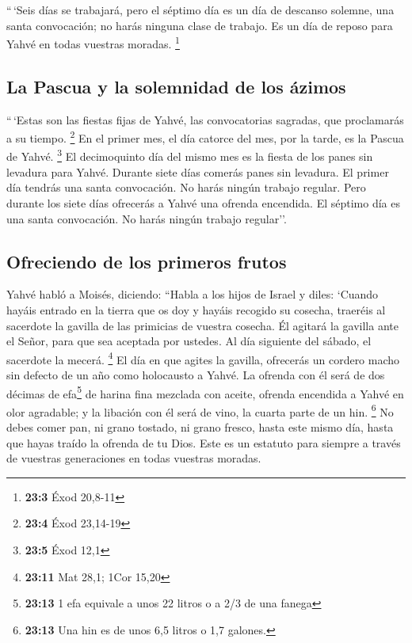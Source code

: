  ``\,`Seis días se trabajará, pero el séptimo día es un
día de descanso solemne, una santa convocación; no harás ninguna clase
de trabajo. Es un día de reposo para Yahvé en todas vuestras moradas.
\footnote{\textbf{23:3} Éxod 20,8-11}

\hypertarget{la-pascua-y-la-solemnidad-de-los-uxe1zimos}{%
\subsection{La Pascua y la solemnidad de los
ázimos}\label{la-pascua-y-la-solemnidad-de-los-uxe1zimos}}

 ``\,`Estas son las fiestas fijas de Yahvé, las
convocatorias sagradas, que proclamarás a su tiempo. \footnote{\textbf{23:4}
  Éxod 23,14-19}  En el primer mes, el día catorce del
mes, por la tarde, es la Pascua de Yahvé. \footnote{\textbf{23:5} Éxod
  12,1}  El decimoquinto día del mismo mes es la fiesta de
los panes sin levadura para Yahvé. Durante siete días comerás panes sin
levadura.  El primer día tendrás una santa convocación. No
harás ningún trabajo regular.  Pero durante los siete días
ofrecerás a Yahvé una ofrenda encendida. El séptimo día es una santa
convocación. No harás ningún trabajo regular''.

\hypertarget{ofreciendo-de-los-primeros-frutos}{%
\subsection{Ofreciendo de los primeros
frutos}\label{ofreciendo-de-los-primeros-frutos}}

 Yahvé habló a Moisés, diciendo:  ``Habla a
los hijos de Israel y diles: `Cuando hayáis entrado en la tierra que os
doy y hayáis recogido su cosecha, traeréis al sacerdote la gavilla de
las primicias de vuestra cosecha.  Él agitará la gavilla
ante el Señor, para que sea aceptada por ustedes. Al día siguiente del
sábado, el sacerdote la mecerá. \footnote{\textbf{23:11} Mat 28,1; 1Cor
  15,20}  El día en que agites la gavilla, ofrecerás un
cordero macho sin defecto de un año como holocausto a Yahvé.
 La ofrenda con él será de dos décimas de efa\footnote{\textbf{23:13}
  1 efa equivale a unos 22 litros o a 2/3 de una fanega} de harina fina
mezclada con aceite, ofrenda encendida a Yahvé en olor agradable; y la
libación con él será de vino, la cuarta parte de un hin. \footnote{\textbf{23:13}
  Una hin es de unos 6,5 litros o 1,7 galones.}  No debes
comer pan, ni grano tostado, ni grano fresco, hasta este mismo día,
hasta que hayas traído la ofrenda de tu Dios. Este es un estatuto para
siempre a través de vuestras generaciones en todas vuestras moradas.

